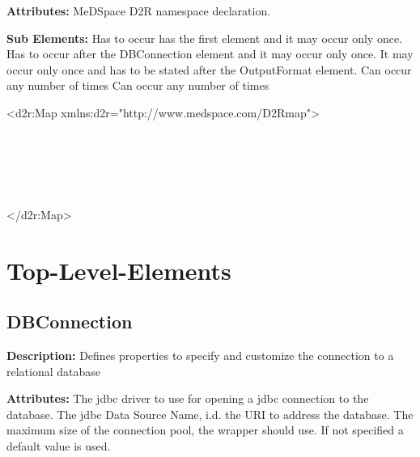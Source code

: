 \textbf{Attributes:} \newline
{}
MeDSpace D2R namespace declaration.
\EndAttribute

\textbf{Sub Elements:} \newline
{}
Has to occur has the first element and it may occur only once. 
\EndAttribute
{}
Has to occur after the DBConnection element and it may occur only once. 
\EndAttribute
{}
It may occur only once and has to be stated after the OutputFormat element. 
\EndAttribute
{}
Can occur any number of times
\EndAttribute
{}
Can occur any number of times
\EndAttribute

\begin{ExampleBox}
	<d2r:Map xmlns:d2r="http://www.medspace.com/D2Rmap">
		\begin{indention}{1cm}
		 \\		
		 \\		
		\\
		\\
		
		\end{indention}
	</d2r:Map>
\end{ExampleBox}


\section{Top-Level-Elements}

\subsection{DBConnection}
\textbf{Description:} \newline
Defines properties to specify and customize the connection to a relational database

\textbf{Attributes:} \newline
{}
The jdbc driver to use for opening a jdbc connection to the database.
\EndAttribute
{}
The jdbc Data Source Name, i.d. the URI to address the database.
\EndAttribute
{}
The maximum size of the connection pool, the wrapper should use. If not specified a default value is used.
\EndAttribute

